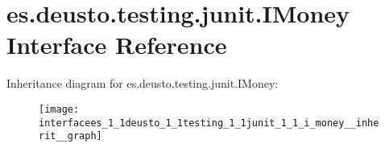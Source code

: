 \hypertarget{interfacees_1_1deusto_1_1testing_1_1junit_1_1_i_money}{}\section{es.\+deusto.\+testing.\+junit.\+I\+Money Interface Reference}
\label{interfacees_1_1deusto_1_1testing_1_1junit_1_1_i_money}


Inheritance diagram for es.\+deusto.\+testing.\+junit.\+I\+Money\+:\nopagebreak
\begin{figure}[H]
\begin{center}
\leavevmode
\texttt{[image: interfacees\_1\_1deusto\_1\_1testing\_1\_1junit\_1\_1\_i\_money\_\_inherit\_\_graph]}
\end{center}
\end{figure}
